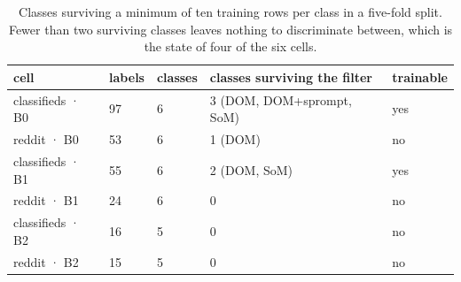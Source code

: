 \begin{table}[tp]
\centering
\caption{Classes surviving a minimum of ten training rows per class in a five-fold split. Fewer than two surviving classes leaves nothing to discriminate between, which is the state of four of the six cells.}
\label{tab:pb04}
\footnotesize
\setlength{\tabcolsep}{3pt}
\begin{tabular}{@{}lllll@{}}
\toprule
cell & labels & classes & classes surviving the filter & trainable \\
\midrule
classifieds · B0 & 97 & 6 & 3 (DOM, DOM+\allowbreak{}sprompt, SoM) & yes \\
reddit · B0 & 53 & 6 & 1 (DOM) & no \\
classifieds · B1 & 55 & 6 & 2 (DOM, SoM) & yes \\
reddit · B1 & 24 & 6 & 0 & no \\
classifieds · B2 & 16 & 5 & 0 & no \\
reddit · B2 & 15 & 5 & 0 & no \\
\bottomrule
\end{tabular}
\end{table}
